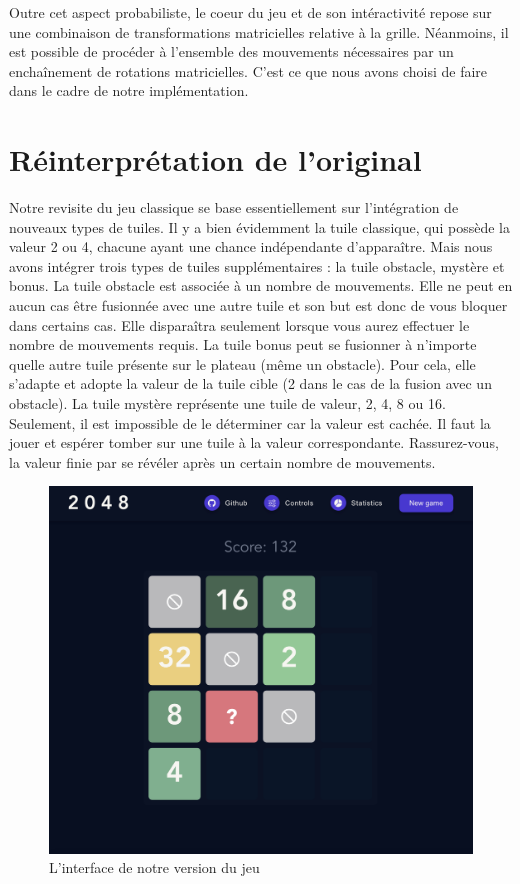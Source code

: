 \documentclass[a4paper, 12pt]{report}
\begin{document}
\vspace{0.5cm}

\tabto{1cm}Outre cet aspect probabiliste, le coeur du jeu et de son intéractivité repose sur une
combinaison de transformations matricielles relative à la grille. Néanmoins, il est possible de
procéder à l'ensemble des mouvements nécessaires par un enchaînement de rotations matricielles.
C'est ce que nous avons choisi de faire dans le cadre de notre implémentation.

\chapter{Réinterprétation de l'original}

\tabto{1cm}Notre revisite du jeu classique se base essentiellement sur l'intégration de nouveaux types de tuiles.
\tabto{1cm}Il y a bien évidemment la tuile classique, qui possède la valeur 2 ou 4, chacune ayant une chance indépendante d'apparaître.
Mais nous avons intégrer trois types de tuiles supplémentaires : la tuile obstacle, mystère et bonus.
\tabto{1cm}La tuile obstacle est associée à un nombre de mouvements. Elle ne peut en aucun cas être fusionnée avec une autre tuile et son but est donc 
de vous bloquer dans certains cas. Elle disparaîtra seulement lorsque vous aurez effectuer le nombre de mouvements requis.
\tabto{1cm}La tuile bonus peut se fusionner à n'importe quelle autre tuile présente sur le plateau (même un obstacle). Pour cela, elle s'adapte et adopte la valeur
de la tuile cible (2 dans le cas de la fusion avec un obstacle).
\tabto{1cm}La tuile mystère représente une tuile de valeur, 2, 4, 8 ou 16. Seulement, il est impossible de le déterminer car la valeur est cachée.
Il faut la jouer et espérer tomber sur une tuile à la valeur correspondante. Rassurez-vous, la valeur finie par se révéler après un certain nombre de mouvements.

\begin{figure}[!t]
\centering
\includegraphics[width=1\textwidth]{../images/2048-revisited-version.jpg}
\caption{L'interface de notre version du jeu}
\label{Revisited version}
\end{figure}
\end{document}
